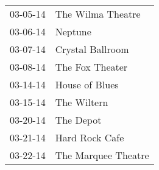 \begin{supertabular}{p{0.07\textwidth}p{0.23\textwidth}}
 03-05-14 &    The Wilma Theatre \\
 03-06-14 &              Neptune \\
 03-07-14 &     Crystal Ballroom \\
 03-08-14 &      The Fox Theater \\
 03-14-14 &       House of Blues \\
 03-15-14 &          The Wiltern \\
 03-20-14 &            The Depot \\
 03-21-14 &       Hard Rock Cafe \\
 03-22-14 &  The Marquee Theatre \\
\end{supertabular}
